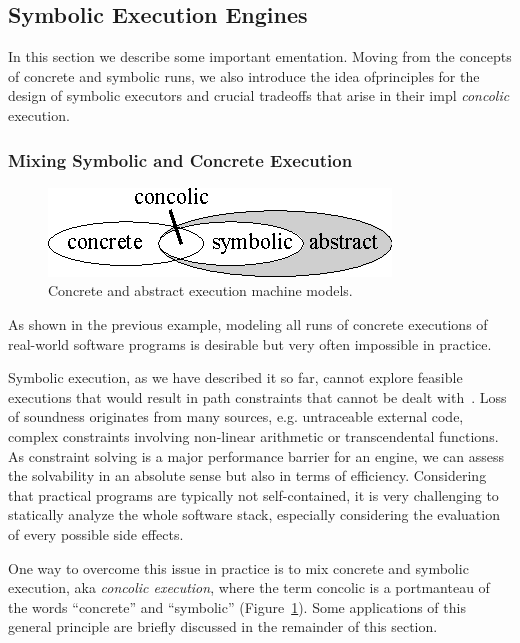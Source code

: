 \subsection{Symbolic Execution Engines}
\label{se:executors}

In this section we describe some important ementation. Moving from the concepts of concrete and symbolic runs, we also introduce the idea ofprinciples for the design of symbolic executors and crucial tradeoffs that arise in their impl {\em concolic} execution.

\subsubsection{Mixing Symbolic and Concrete Execution}
\label{ss:concrete-concolic-symbolic}

\begin{figure}[t]
	\centering
	\includegraphics[width=0.32\columnwidth]{images/concrete-abstract.eps} 
	\caption{Concrete and abstract execution machine models.}
	\label{fig:concrete-symbolic}
	\vspace{-1.5mm}
\end{figure}

As shown in the previous example, modeling all runs of concrete executions of real-world software programs is desirable but very often impossible in practice.

Symbolic execution, as we have described it so far, cannot explore feasible executions that would result in path constraints that cannot be dealt with~\cite{CS-CACM13}. Loss of soundness originates from many sources, e.g. untraceable external code, complex constraints involving non-linear arithmetic or transcendental functions. As constraint solving is a major performance barrier for an engine, we can assess the solvability in an absolute sense but also in terms of efficiency. Considering that practical programs are typically not self-contained, it is very challenging to statically analyze the whole software stack, especially considering the evaluation of every possible side effects.

One way to overcome this issue in practice is to mix concrete and symbolic execution, aka {\em concolic execution}, where the term concolic is a portmanteau of the words ``concrete'' and ``symbolic'' (Figure~\ref{fig:concrete-symbolic}). Some applications of this general principle are briefly discussed in the remainder of this section.


